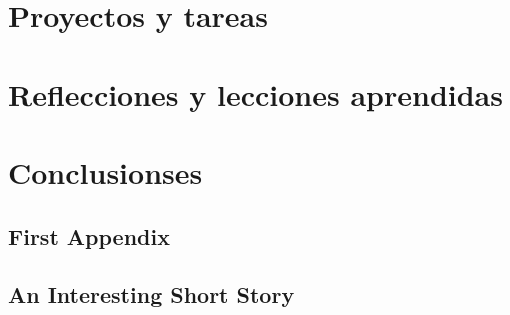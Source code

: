 \documentclass[pdftex,spanish]{pucthesis}	%
\begin{document}
\chapter[PROYECTOS Y TAREAS]{Proyectos y tareas} \label{ch2}


\chapter[REFLECCIONES Y LECCIONES APRENDIDAS]{Reflecciones y lecciones aprendidas} \label{ch3}


\chapter[CONCLUSIONSES]{Conclusionses}



\cleardoublepage
{} \label{references}
\renewcommand{\bibname}{REFERENCIAS}



\printbibliography


\appendix

\newpage
\section[First Appendix]{First Appendix}


\newpage
\section[An Interesting Short Story]{An Interesting Short Story}

\end{document}

